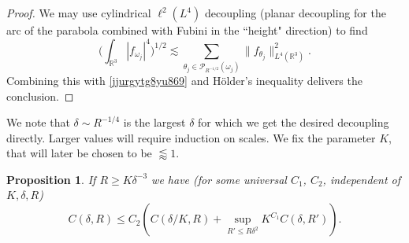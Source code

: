 \documentclass{amsart}%
\numberwithin{equation}{section}
\newtheorem{proposition}[theorem]{Proposition}
\newcommand{\cP}{\mathcal P}
\newcommand{\R}{\mathbb{R}}
\newcommand{\1}{\mathbbm{1}}
\begin{document}
\begin{proof}
		We may use cylindrical $\ell^2(L^4)$ decoupling (planar decoupling for the arc of the parabola combined with Fubini in the ``height" direction)  to find
		$$\big(\int_{\R^3}|f_{\omega_j}|^4\big)^{1/2}\lesssim \sum _{\theta_j\in \cP_{R^{-1/2}}(\omega_j)}\|f_{\theta_j}\|^2_{L^4(\R^3)}.$$ 
		Combining this with \eqref{jjurgytg8yu869} and H\"older's inequality delivers the conclusion.\qedhere
        
		
		
	\end{proof}	 
	We note that $\delta\sim R^{-1/4}$ is the largest $\delta$ for which we get the desired decoupling directly. Larger values will require induction on scales.  We fix the parameter $K$, that will later be chosen to be $\lessapprox 1$.
    \begin{proposition}
		\label{diowue8tu954iy967u989}
		If $R\ge K\delta^{-3}$ we have (for some universal $C_1$, $C_2$, independent of $K,\delta,R$)
		\begin{equation}
			\label{bfjrhfurhgrugy}
			C(\delta,R)\le C_2( C(\delta/K,R)+\sup_{R'\le R\delta^2}K^{C_1}C(\delta,R')).
		\end{equation}
	\end{proposition}
\end{document}
